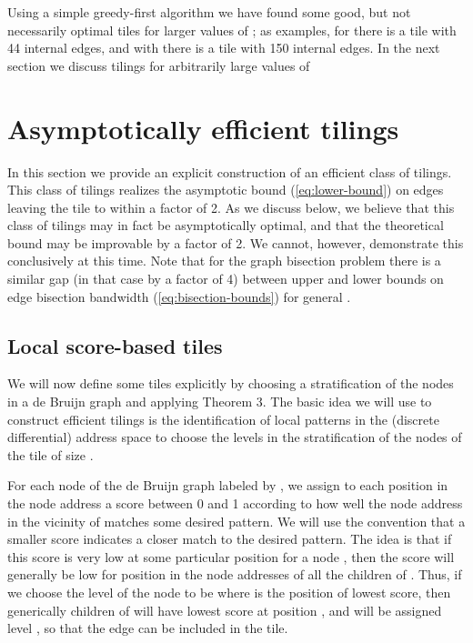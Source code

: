 \documentclass[12pt]{article}
\begin{document}
Using a simple greedy-first algorithm we have found some good, but not
necessarily optimal tiles for larger values of ; as examples, for
 there is a tile with 44 internal edges, and with  there is a tile with  150 internal edges.  In the next section we
discuss tilings for arbitrarily large values of 


\section{Asymptotically efficient tilings}
\label{sec:efficient}

In this section we provide an explicit construction of an efficient
class of tilings.  This class of tilings realizes the asymptotic bound
(\ref{eq:lower-bound}) on edges leaving the tile to within a factor of
2.  As we discuss below, we believe that this class of tilings may in
fact be asymptotically optimal, and that the theoretical bound may be
improvable by a factor of 2.  We cannot, however, demonstrate this
conclusively at this time.  Note that for the graph bisection problem
there is a similar gap (in that case by a factor of 4) between upper
and lower bounds on edge bisection bandwidth
(\ref{eq:bisection-bounds}) for general  \cite{rttv}.


\subsection{Local score-based tiles}
\label{sec:score-tiles}

We will now define some tiles explicitly by choosing a stratification
of the nodes in a de Bruijn graph and applying Theorem 3.
The basic idea we will use to construct efficient tilings is the
identification of local patterns in the  (discrete differential)
address space to choose the levels in the stratification of the nodes
of the tile of size .

For each node of the de Bruijn graph
 labeled by , we
assign to each position in the node address a score between 0 and 1
according to how well the node address in the vicinity of 
matches some desired pattern.  We will use the convention that a
smaller score indicates a closer match to the desired pattern.  The
idea is that if this score is very low at some particular position
 for a node , then the score will generally be
low for position  in the node addresses of all the children of
.  Thus, if we choose the level of the node  to be 
where  is the position of lowest score, then generically children
 of  will have lowest score at position , and will be
assigned level , so that the edge  can
be included in the tile.
\end{document}
